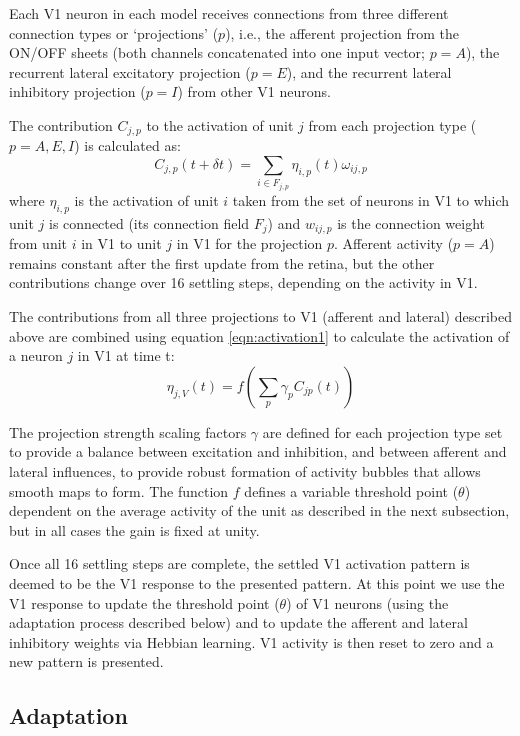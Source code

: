 Each V1 neuron in each model receives connections from three different
connection types or `projections' ($p$), i.e., the afferent projection
from the ON/OFF sheets (both channels concatenated into one input
vector; $p=A$), the recurrent lateral excitatory projection ($p=E$),
and the recurrent lateral inhibitory projection ($p=I$) from other V1
neurons.

The contribution $C_{j,p}$ to the activation of unit $j$ from each
projection type ($p=A,E,I$) is calculated as:
\begin{equation}
C_{j,p}(t+\delta t)=\sum_{i\in F_{j,p}}\eta_{i, p}(t)\omega_{ij,p}
\label{eqn:update}
\end{equation}
where $\eta_{i, p}$ is the activation of unit $i$ taken from the set
of neurons in V1 to which unit $j$ is connected (its connection field
$F_j$) and $w_{ij,p}$ is the connection weight from unit $i$ in V1 to
unit $j$ in V1 for the projection $p$. Afferent activity ($p=A$)
remains constant after the first update from the retina, but the other
contributions change over 16 settling steps, depending on the activity
in V1.

The contributions from all three projections to V1 (afferent and
lateral) described above are combined using equation
\ref{eqn:activation1} to calculate the activation of a
neuron $j$ in V1 at time t:
\begin{equation}
\eta_{j,V}(t)=f\left(\sum_{p}\gamma_{p}C_{jp}(t)\right)
\label{eqn:activation1}
\end{equation}

The projection strength scaling factors $\gamma$ are defined for each
projection type set to provide a balance between excitation and
inhibition, and between afferent and lateral influences, to provide
robust formation of activity bubbles that allows smooth maps to
form. The function $f$ defines a variable threshold point ($\theta$)
dependent on the average activity of the unit as described in the next
subsection, but in all cases the gain is fixed at unity.

Once all 16 settling steps are complete, the settled V1 activation
pattern is deemed to be the V1 response to the presented pattern. At
this point we use the V1 response to update the threshold point
($\theta$) of V1 neurons (using the adaptation process described
below) and to update the afferent and lateral inhibitory weights via
Hebbian learning. V1 activity is then reset to zero and a new pattern
is presented.

\subsection*{Adaptation}

